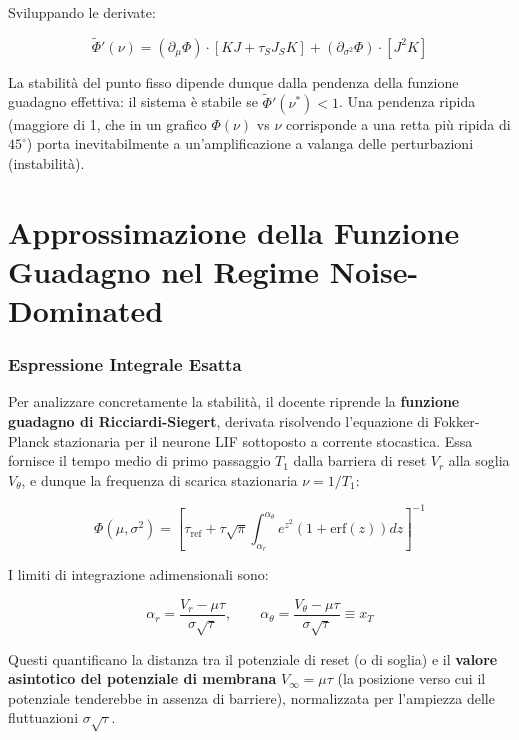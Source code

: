 Sviluppando le derivate:

\begin{equation}
\tilde{\Phi}'(\nu) = (\partial_\mu\Phi) \cdot \left[KJ + \tau_S J_S K\right] + (\partial_{\sigma^2}\Phi) \cdot \left[J^2 K\right]
\end{equation}

La stabilità del punto fisso dipende dunque dalla pendenza della funzione guadagno effettiva: il sistema è stabile se $\tilde{\Phi}'(\nu^*) < 1$. Una pendenza ripida (maggiore di 1, che in un grafico $\Phi(\nu)$ vs $\nu$ corrisponde a una retta più ripida di $45^\circ$) porta inevitabilmente a un'amplificazione a valanga delle perturbazioni (instabilità).


\section{Approssimazione della Funzione Guadagno nel Regime Noise-Dominated}

\subsubsection{Espressione Integrale Esatta}

Per analizzare concretamente la stabilità, il docente riprende la \textbf{funzione guadagno di Ricciardi-Siegert}, derivata risolvendo l'equazione di Fokker-Planck stazionaria per il neurone LIF sottoposto a corrente stocastica. Essa fornisce il tempo medio di primo passaggio $T_1$ dalla barriera di reset $V_r$ alla soglia $V_\theta$, e dunque la frequenza di scarica stazionaria $\nu = 1/T_1$:

\begin{equation}
\Phi(\mu, \sigma^2) = \left[\tau_{\text{ref}} + \tau\sqrt{\pi} \int_{\alpha_r}^{\alpha_\theta} e^{z^2}\!\left(1 + \text{erf}(z)\right) dz \right]^{-1}
\end{equation}

I limiti di integrazione adimensionali sono:

\begin{equation}
\alpha_r = \frac{V_r - \mu\tau}{\sigma\sqrt{\tau}}, \qquad \alpha_\theta = \frac{V_\theta - \mu\tau}{\sigma\sqrt{\tau}} \equiv x_T
\end{equation}

Questi quantificano la distanza tra il potenziale di reset (o di soglia) e il \textbf{valore asintotico del potenziale di membrana} $V_\infty = \mu\tau$ (la posizione verso cui il potenziale tenderebbe in assenza di barriere), normalizzata per l'ampiezza delle fluttuazioni $\sigma\sqrt{\tau}$.


